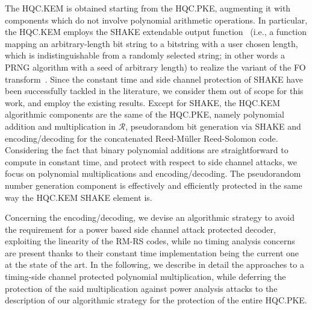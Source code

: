 The HQC.KEM is obtained starting from the HQC.PKE, augmenting it with components
which do not involve polynomial arithmetic operations. 
In particular, the HQC.KEM employs the \textsc{SHAKE} extendable output function~\cite{SHAandSHAKE} (i.e., a function mapping an arbitrary-length bit 
string to a bitstring with a user chosen length, which is indistinguishable from
a randomly selected string; in other words a PRNG algorithm with a seed of 
arbitrary length) to realize the variant of the FO 
transform~\cite{DBLP:conf/tcc/HofheinzHK17}. Since the constant time and 
side channel protection of \textsc{SHAKE} have been successfully tackled in the 
literature, we consider them out of scope for this work, 
and employ the existing results.
Except for \textsc{SHAKE}, the HQC.KEM algorithmic components are the same of the 
HQC.PKE, namely polynomial addition and multiplication in $\mathcal{R}$, 
pseudorandom bit generation via \textsc{SHAKE} and encoding/decoding for the 
concatenated Reed-M\"{u}ller Reed-Solomon code.
Considering the fact that binary polynomial additions are straightforward to 
compute in constant time, and protect with respect to side channel attacks, 
we focus on polynomial multiplications and encoding/decoding. The pseudorandom
number generation component is effectively and efficiently protected in the
same way the HQC.KEM \textsc{SHAKE} element is.

Concerning the encoding/decoding, we devise an algorithmic strategy to avoid
the requirement for a power based side channel attack protected decoder, 
exploiting the linearity of the RM-RS codes, while no timing analysis concerns 
are present thanks to their constant time implementation being the current one 
at the state of the art.
In the following, we describe in detail the approaches to a timing-side channel
protected polynomial multiplication, while deferring the protection of the said
multiplication against power analysis attacks to the description of our 
algorithmic strategy for the protection of the entire HQC.PKE.

